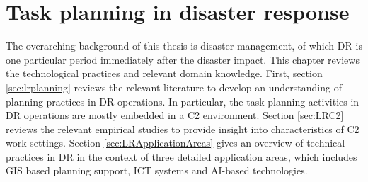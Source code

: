 \chapter{Task planning in disaster response}\label{ch:literatures}
The overarching background of this thesis is disaster management, of which \acf{DR} is one particular period immediately after the disaster impact. This chapter reviews the technological practices and relevant domain knowledge. First, section \ref{sec:lrplanning} reviews the relevant literature to develop an understanding of planning practices in \ac{DR} operations. In particular, the task planning activities in \ac{DR} operations are mostly embedded in a \acf{C2} environment. Section \ref{sec:LRC2} reviews the relevant empirical studies to provide insight into characteristics of \ac{C2} work settings. Section \ref{sec:LRApplicationAreas} gives an overview of technical practices in \ac{DR} in the context of three detailed application areas, which includes \acf{GIS} based planning support, \acf{ICT} systems and \ac{AI}-based technologies. \\



